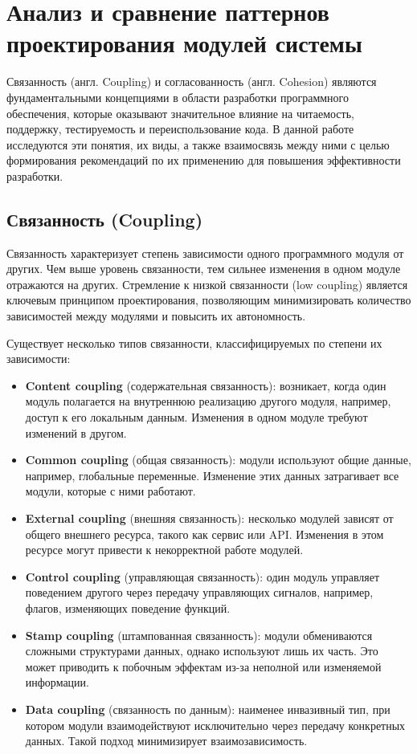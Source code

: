 \section{Анализ и сравнение паттернов проектирования модулей системы}

Связанность (англ. Coupling) и согласованность (англ. Cohesion) являются фундаментальными концепциями в области разработки программного обеспечения, которые оказывают значительное влияние на читаемость, поддержку, тестируемость и переиспользование кода. В данной работе исследуются эти понятия, их виды, а также взаимосвязь между ними с целью формирования рекомендаций по их применению для повышения эффективности разработки.

\subsection*{Связанность (Coupling)}

Связанность характеризует степень зависимости одного программного модуля от других. Чем выше уровень связанности, тем сильнее изменения в одном модуле отражаются на других. Стремление к низкой связанности (low coupling) является ключевым принципом проектирования, позволяющим минимизировать количество зависимостей между модулями и повысить их автономность.

Существует несколько типов связанности, классифицируемых по степени их зависимости:

\begin{itemize}
    \item \textbf{Content coupling} (содержательная связанность): возникает, когда один модуль полагается на внутреннюю реализацию другого модуля, например, доступ к его локальным данным. Изменения в одном модуле требуют изменений в другом.
    \item \textbf{Common coupling} (общая связанность): модули используют общие данные, например, глобальные переменные. Изменение этих данных затрагивает все модули, которые с ними работают.
    \item \textbf{External coupling} (внешняя связанность): несколько модулей зависят от общего внешнего ресурса, такого как сервис или API. Изменения в этом ресурсе могут привести к некорректной работе модулей.
    \item \textbf{Control coupling} (управляющая связанность): один модуль управляет поведением другого через передачу управляющих сигналов, например, флагов, изменяющих поведение функций.
    \item \textbf{Stamp coupling} (штампованная связанность): модули обмениваются сложными структурами данных, однако используют лишь их часть. Это может приводить к побочным эффектам из-за неполной или изменяемой информации.
    \item \textbf{Data coupling} (связанность по данным): наименее инвазивный тип, при котором модули взаимодействуют исключительно через передачу конкретных данных. Такой подход минимизирует взаимозависимость.
\end{itemize}

